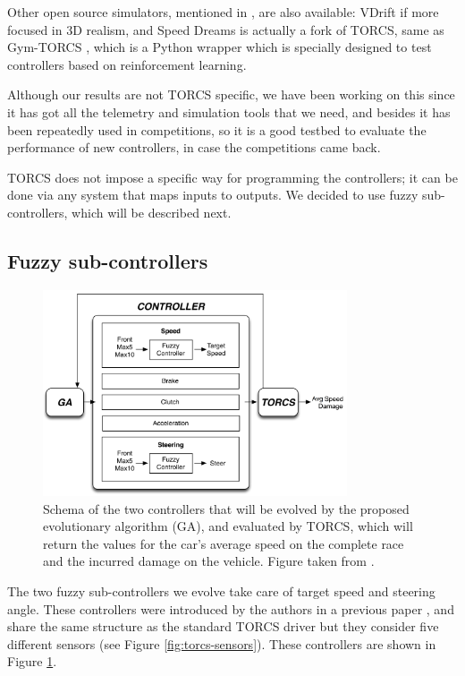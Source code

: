 \documentclass[10pt,journal,compsoc]{IEEEtran}
\begin{document}
Other open source simulators, mentioned in \cite{Loiacono:2012:LEA:2212908.2212953}, are also available: VDrift
if more focused in 3D realism, and Speed Dreams is actually a fork of
TORCS, same as Gym-TORCS \cite{yoshida2016gym}, which is a Python
wrapper which is specially designed to test controllers based on
reinforcement learning.

Although our results are not TORCS specific, we have been
working on this since it has got all the telemetry and simulation
tools that we need, and besides it has been repeatedly used in
competitions, so it is a good testbed to evaluate the performance of new controllers, in case the competitions came back.

TORCS does not impose a specific way for programming the controllers;
it can be done via any system that maps inputs to outputs. We decided
to use fuzzy sub-controllers, which will be described next.


\subsection{Fuzzy sub-controllers}
\label{subsec:fuzzy-controllers}

\begin{figure}[!ht]
  \label{fig:ga}
  \begin{center}
    \includegraphics[width=9cm]{fig/flowchart}
  \end{center}
  \caption{Schema of the two controllers that will be evolved by the proposed 
    evolutionary algorithm (GA), and evaluated by TORCS, which will
    return the values for the car's average speed on the complete race and the incurred damage on the vehicle. Figure taken from \cite{salem_evo18}.}
\end{figure}
%
The two fuzzy sub-controllers we evolve take care of target speed and steering angle. These controllers were introduced by the authors in a previous paper \cite{DBLP:conf/evoW/SalemMMG17}, and share the same structure as the standard TORCS driver but they consider five different sensors (see Figure \ref{fig:torcs-sensors}). These controllers are shown in Figure \ref{fig:ga}. 
\end{document}
